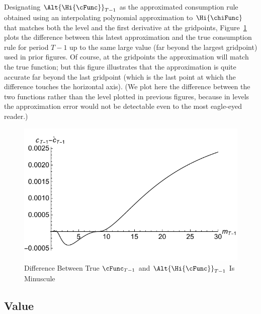 \documentclass[titlepage, headings=optiontotocandhead]{\econtex}
\begin{document}
Designating $\Alt{\Hi{\cFunc}}_{T-1}$ as the approximated consumption rule obtained using an interpolating polynomial approximation to $\Hi{\chiFunc}$ that matches both the level and the first derivative at the gridpoints, Figure~\ref{fig:IntExpFOCInvPesReaOptGapPlot} plots the difference between this latest approximation and the true consumption rule for period $T-1$ up to the same large value (far beyond the largest gridpoint) used in prior figures.  Of course, at the gridpoints the approximation will match the true function; but this figure illustrates that the approximation is quite accurate far beyond the last gridpoint (which is the last point at which the difference touches the horizontal axis).  (We plot here the difference between the two functions rather than the level plotted in previous figures, because in levels the approximation error would not be detectable even to the most eagle-eyed reader.)



\hypertarget{IntExpFOCInvPesReaOptGapPlot}{}
\begin{figure}
  \includegraphics{./Figures/IntExpFOCInvPesReaOptGapPlot}
  \caption{Difference Between True $\cFunc_{T-1}$ and $\Alt{\Hi{\cFunc}}_{T-1}$ Is Minuscule}
  \label{fig:IntExpFOCInvPesReaOptGapPlot}
\end{figure}




\hypertarget{Value}{}
\subsection{Value}
\end{document}

